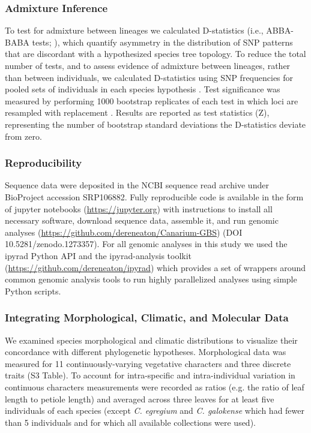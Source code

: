 \documentclass[10pt,letterpaper]{article}
\begin{document}
\subsubsection*{Admixture Inference}
To test for admixture between lineages we calculated D-statistics (i.e., ABBA-BABA tests; \cite{durand_testing_2011}), which quantify asymmetry in the distribution of SNP patterns that are discordant with a hypothesized species tree topology. To reduce the total number of tests, and to assess evidence of admixture between lineages, rather than between individuals, we calculated D-statistics using SNP frequencies for pooled sets of individuals in each species hypothesis \cite{durand_testing_2011}. Test significance was measured by performing 1000 bootstrap replicates of each test in which loci are resampled with replacement \cite{eaton_inferring_2013}. Results are reported as test statistics (Z), representing the number of bootstrap standard deviations the D-statistics deviate from zero. 

\subsubsection*{Reproducibility}
Sequence data were deposited in the NCBI sequence read archive under BioProject accession SRP106882. Fully reproducible code is available in the form of jupyter notebooks (\url{https://jupyter.org}) with instructions to install all necessary software, download sequence data, assemble it, and run genomic analyses (\url{https://github.com/dereneaton/Canarium-GBS}) (DOI 10.5281/zenodo.1273357). For all genomic analyses in this study we used the ipyrad Python API and the ipyrad-analysis toolkit (\url{https://github.com/dereneaton/ipyrad}) which provides a set of wrappers around common genomic analysis tools to run highly parallelized analyses using simple Python scripts. 

\subsubsection*{Integrating Morphological, Climatic, and Molecular Data}
We examined species morphological and climatic distributions to visualize their concordance with different phylogenetic hypotheses. Morphological data was measured for 11 continuously-varying vegetative characters and three discrete traits (S3 Table). %
To account for intra-specific and intra-individual variation in continuous characters measurements were recorded as ratios (e.g. the ratio of leaf length to petiole length) and averaged across three leaves for at least five individuals of each species (except \emph{C. egregium} and \emph{C. galokense} which had fewer than 5 individuals and for which all available collections were used). 
\end{document}
